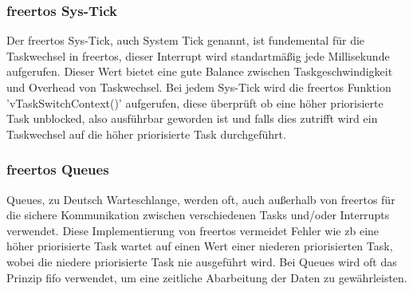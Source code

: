 \documentclass[../EDF Master Thesis.tex]{subfiles}
\begin{document}
\subsubsection{\ac{freertos} Sys-Tick} \label{section:freertos_sys_tick}
Der \ac{freertos} Sys-Tick, auch System Tick genannt, ist fundemental für die Taskwechsel in \ac{freertos}, dieser Interrupt wird standartmäßig jede Millisekunde aufgerufen.
Dieser Wert bietet eine gute Balance zwischen Taskgeschwindigkeit und Overhead von Taskwechsel.
Bei jedem Sys-Tick wird die \ac{freertos} Funktion 'vTaskSwitchContext()' aufgerufen, diese überprüft ob eine höher priorisierte Task unblocked, also ausführbar geworden ist und falls dies zutrifft wird ein Taskwechsel auf die höher priorisierte Task durchgeführt.

\subsubsection{\ac{freertos} Queues} \label{section:queues}
Queues, zu Deutsch Warteschlange, werden oft, auch außerhalb von \ac{freertos} für die sichere Kommunikation zwischen verschiedenen Tasks und/oder Interrupts verwendet.
Diese Implementierung von \ac{freertos} vermeidet Fehler wie \ac{zb} eine höher priorisierte Task wartet auf einen Wert einer niederen priorisierten Task, wobei die niedere priorisierte Task nie ausgeführt wird.
Bei Queues wird oft das Prinzip \ac{fifo} verwendet, um eine zeitliche Abarbeitung der Daten zu gewährleisten.
\end{document}
